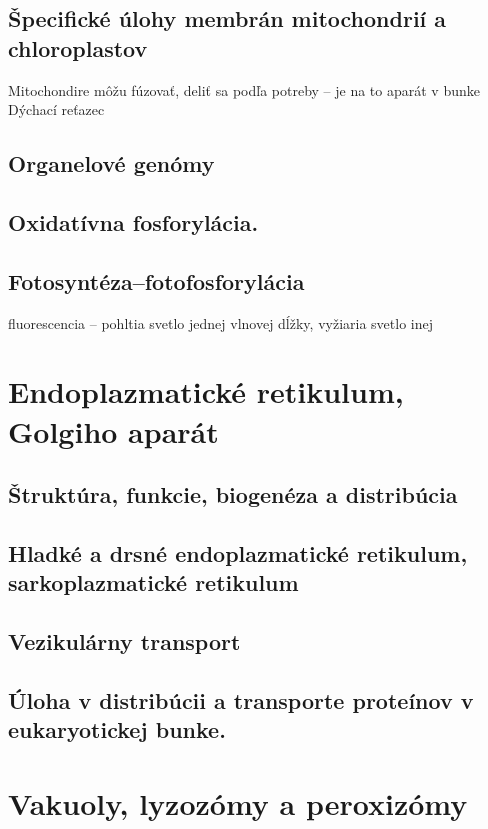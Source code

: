 \subsection{Špecifické úlohy membrán mitochondrií a chloroplastov}
Mitochondire môžu fúzovať, deliť sa podľa potreby -- je na to aparát v bunke\\
Dýchací reťazec\\

\subsection{Organelové genómy}

\subsection{Oxidatívna fosforylácia.}

\subsection{Fotosyntéza--fotofosforylácia}
fluorescencia -- pohltia svetlo jednej vlnovej dĺžky, vyžiaria svetlo inej\\

\section{Endoplazmatické retikulum, Golgiho aparát}

\subsection{Štruktúra, funkcie, biogenéza a distribúcia}

\subsection{Hladké a drsné endoplazmatické retikulum, sarkoplazmatické retikulum}

\subsection{Vezikulárny transport}

\subsection{Úloha v distribúcii a transporte proteínov v eukaryotickej bunke.}

\section{Vakuoly, lyzozómy a peroxizómy}

